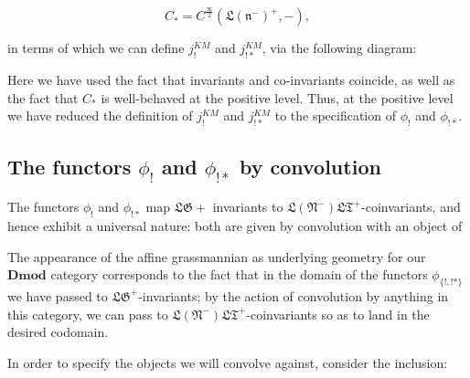 \documentclass[12pt]{amsart}
\newcommand\LT{\mathfrak{LT}}
\newcommand\LN{\mathfrak{LN}}
\newcommand\LNm{\mathfrak{L}(\mathfrak{N}^-)}
\newcommand\Lnm{\mathfrak{L}(\mathfrak{n}^-)}
\newcommand\LG{\mathfrak{LG}}
\newcommand\afftmod{\hat{\mathfrak{t}}-\mathbf{Mod}}
\newcommand\affgmod{\hat{\mathfrak{g}}-\mathbf{Mod}}
\newcommand\DMod{\mathbf{Dmod}}
\newcommand\IC{\mathbf{IC}}
\newcommand\Gr{\mathbf{Gr}}
\newcommand\semiinf{\frac{\infty}{2}}
\newcommand\KL{\mathbf{KL}}
\newcommand\poslv{\kappa}
\begin{document}
  $$C_* = C^{\semiinf}(\Lnm^+, -),$$

  in terms of which we can define $j_!^{KM}$ and $j_{!*}^{KM}$, via the following diagram:


Here we have used the fact that invariants and co-invariants coincide, as well
as the fact that $C_*$ is well-behaved at the positive level. Thus, at the
positive level we have reduced the definition of $j_!^{KM}$ and $j_{!*}^{KM}$ to
the specification of
$\phi_!$ and $\phi_{!*}$.

\subsection{The functors $\phi_{!}$ and $\phi_{!*}$ by convolution}
The functors $\phi_!$ and $\phi_{!*}$ map $\LG+$
invariants to $\LNm\LT^+$-coinvariants, and hence exhibit a universal nature:
both are given by convolution with an object of


  The appearance of the affine grassmannian as underlying geometry for our
  $\DMod$ category corresponds to the fact that in the domain of the functors
  $\phi_{\{!,!*\}}$ we have passed to
  $\LG^+$-invariants; by the action of convolution by anything in this category,
  we can pass to $\LNm\LT^+$-coinvariants so as to land in the desired codomain.

  In order to specify the objects we will convolve against, consider the
  inclusion:

\end{document}
